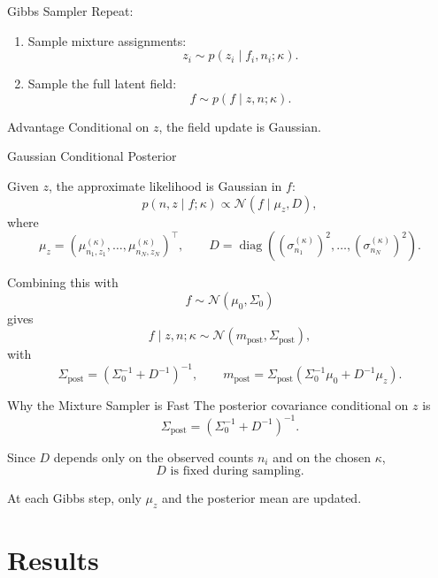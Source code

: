 \documentclass[11pt]{beamer}
\newcommand{\N}{\mathcal N}
\begin{document}
\begin{frame}{Gibbs Sampler}
Repeat:

\medskip
\begin{enumerate}
\item Sample mixture assignments:
\[
z_i \sim p(z_i\mid f_i,n_i;\kappa).
\]

\item Sample the full latent field:
\[
f\sim p(f\mid z,n;\kappa).
\]
\end{enumerate}

\medskip
\begin{block}{Advantage}
Conditional on \(z\), the field update is Gaussian.
\end{block}
\end{frame}

\begin{frame}{Gaussian Conditional Posterior}
\small

Given \(z\), the approximate likelihood is Gaussian in \(f\):
\[
p(n,z\mid f;\kappa)
\propto
\N(f\mid \mu_z,D),
\]
where
\[
\mu_z=
(\mu_{n_1,z_1}^{(\kappa)},\dots,\mu_{n_N,z_N}^{(\kappa)})^\top,
\qquad
D=
\operatorname{diag}
\left(
(\sigma_{n_1}^{(\kappa)})^2,\dots,
(\sigma_{n_N}^{(\kappa)})^2
\right).
\]

Combining this with
\[
f\sim\N(\mu_0,\Sigma_0)
\]
gives
\[
f\mid z,n;\kappa \sim \N(m_{\mathrm{post}},\Sigma_{\mathrm{post}}),
\]
with
\[
\Sigma_{\mathrm{post}}
=
(\Sigma_0^{-1}+D^{-1})^{-1},
\qquad
m_{\mathrm{post}}
=
\Sigma_{\mathrm{post}}
(\Sigma_0^{-1}\mu_0+D^{-1}\mu_z).
\]
\end{frame}

\begin{frame}{Why the Mixture Sampler is Fast}
The posterior covariance conditional on \(z\) is
\[
\Sigma_{\mathrm{post}}
=
(\Sigma_0^{-1}+D^{-1})^{-1}.
\]

Since \(D\) depends only on the observed counts \(n_i\) and on the chosen \(\kappa\),
\[
D \text{ is fixed during sampling.}
\]

\medskip
\begin{alertblock}{}
At each Gibbs step, only \(\mu_z\) and the posterior mean are updated.
\end{alertblock}
\end{frame}

\section{Results}
\end{document}
